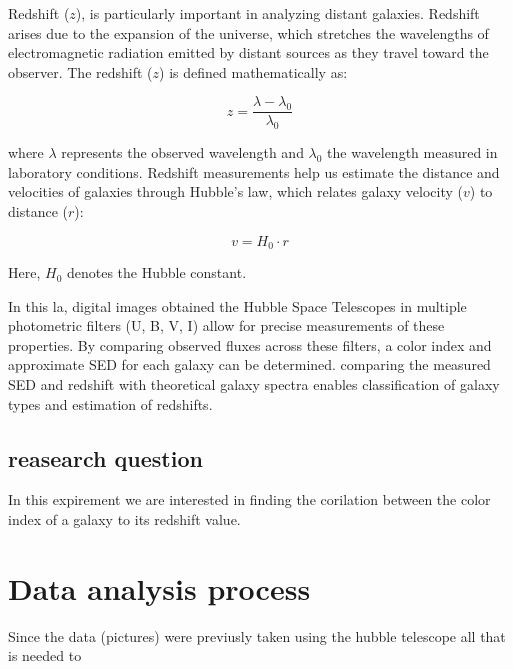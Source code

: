 \documentclass[11pt,a4paper]{article}
\begin{document}
Redshift ($z$), is particularly important in analyzing distant galaxies. Redshift arises due to the expansion of the universe, which stretches the wavelengths of electromagnetic radiation emitted by distant sources as they travel toward the observer. The redshift ($z$) is defined mathematically as:

\begin{equation}
 z =  \frac{\lambda - \lambda_0}{\lambda_0}
\end{equation}



where $\lambda$ represents the observed wavelength and $\lambda_0$ the  wavelength measured in laboratory conditions. Redshift measurements help us estimate the distance and velocities of galaxies through Hubble's law, which relates galaxy velocity ($v$) to distance ($r$):

\begin{equation}
  v = H_0 \cdot r
\end{equation}


Here, $H_0$ denotes the Hubble constant.

In this la, digital images obtained the Hubble Space Telescopes in multiple photometric filters (U, B, V, I) allow for precise measurements of these properties. By comparing observed fluxes across these filters, a color index and approximate SED for each galaxy can be determined. comparing the measured SED and redshift with theoretical galaxy spectra enables classification of galaxy types and estimation of redshifts.


\subsection{reasearch question}
In this expirement we are interested in finding the corilation between the color index of a galaxy to its redshift value.


\pagebreak
\section{Data analysis process}
Since the data (pictures) were previusly taken using the hubble telescope all that is needed to
\end{document}

